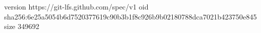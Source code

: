 version https://git-lfs.github.com/spec/v1
oid sha256:6e25a5054b6d7520377619c90b3b1f8c926b9b02180788dca7021b423750e845
size 349692
